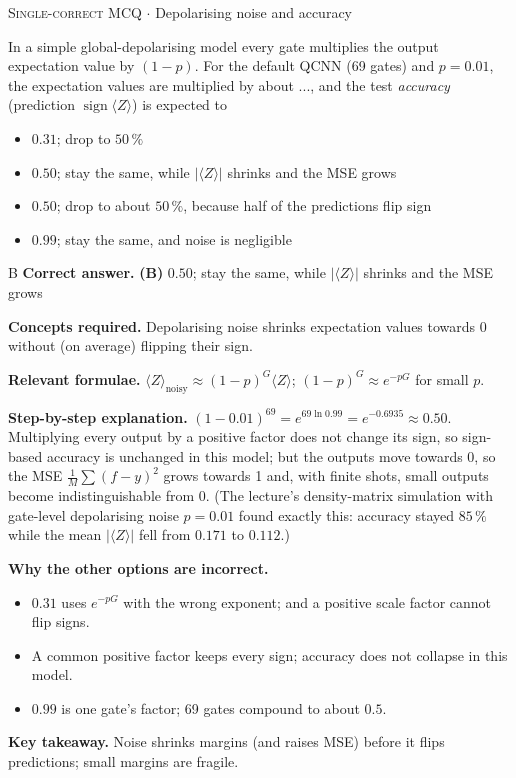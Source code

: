 \documentclass[11pt,a4paper]{article}
\newcommand{\optlabel}[1]{\textbf{(#1)}}
\newcommand{\correctlabel}[1]{\textcolor{okgreen}{\textbf{(#1)}\,\ding{51}}}
\newenvironment{qitem}[1]{\begin{list}{}{\setlength{\leftmargin}{3.3em}\setlength{\labelwidth}{3.1em}%
  \setlength{\labelsep}{0.2em}\setlength{\topsep}{3pt}\setlength{\parsep}{3pt}}\item[\textbf{Q.#1}\hfill]}{\end{list}}
\newcommand{\qsep}{\par\vspace{2pt}{\color{black!15}\hrule}\vspace{4pt}}
\newcommand{\qmeta}[2]{{\footnotesize\color{black!60}\textsc{#1} \;$\cdot$\; #2}\par}
\begin{document}
\begin{qitem}{64}
\qmeta{Single-correct MCQ}{Depolarising noise and accuracy}
In a simple global-depolarising model every gate multiplies the output expectation value by $(1 - p)$. For the default
QCNN (69 gates) and $p = 0.01$, the expectation values are multiplied by about ..., and the test \emph{accuracy} (prediction
$\operatorname{sign}\langle Z\rangle$) is expected to
\begin{itemize}[leftmargin=2.6em, labelsep=0.4em, itemsep=2pt, topsep=3pt]
\item[\optlabel{A}] $0.31$; drop to $50\,\%$
\item[\correctlabel{B}] $0.50$; stay the same, while $|\langle Z\rangle|$ shrinks and the MSE grows
\item[\optlabel{C}] $0.50$; drop to about $50\,\%$, because half of the predictions flip sign
\item[\optlabel{D}] $0.99$; stay the same, and noise is negligible
\end{itemize}
\end{qitem}
\begin{solbox}{B}
\textbf{\color{brand}Correct answer.} \textcolor{okgreen}{\textbf{(B)}} $0.50$; stay the same, while $|\langle Z\rangle|$ shrinks and the MSE grows

\textbf{\color{brand}Concepts required.} Depolarising noise shrinks expectation values towards 0 without (on average) flipping their sign.

\textbf{\color{brand}Relevant formulae.} $\langle Z\rangle_{\text{noisy}} \approx (1 - p)^G\langle Z\rangle$; $(1 - p)^G \approx e^{-pG}$ for small $p$.

\textbf{\color{brand}Step-by-step explanation.} $(1 - 0.01)^{69} = e^{69\ln0.99} = e^{-0.6935} \approx 0.50$. Multiplying every output by a positive factor does not change its
sign, so sign-based accuracy is unchanged in this model; but the outputs move towards 0, so the MSE $\frac1M\sum(f - y)^2$ grows
towards 1 and, with finite shots, small outputs become indistinguishable from 0. (The lecture's density-matrix simulation with
gate-level depolarising noise $p = 0.01$ found exactly this: accuracy stayed $85\,\%$ while the mean $|\langle Z\rangle|$ fell from $0.171$ to $0.112$.)

\textbf{\color{brand}Why the other options are incorrect.}
\begin{itemize}[leftmargin=2.4em, itemsep=1pt, topsep=2pt]
\item[\textbf{(A)}] $0.31$ uses $e^{-pG}$ with the wrong exponent; and a positive scale factor cannot flip signs.
\item[\textbf{(C)}] A common positive factor keeps every sign; accuracy does not collapse in this model.
\item[\textbf{(D)}] $0.99$ is one gate's factor; 69 gates compound to about $0.5$.
\end{itemize}
\textbf{\color{brand}Key takeaway.} Noise shrinks margins (and raises MSE) before it flips predictions; small margins are fragile.
\end{solbox}
\qsep
\end{document}
